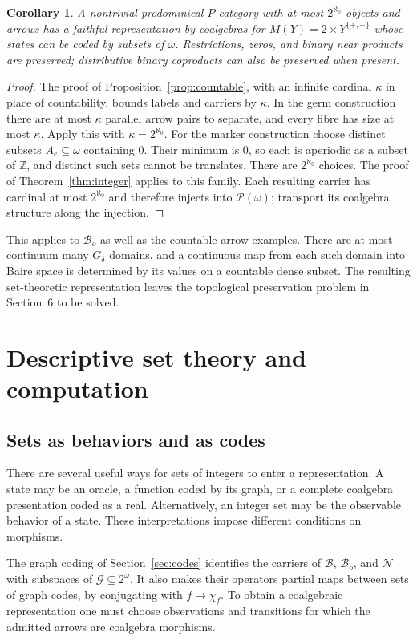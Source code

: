 \documentclass[11pt]{article}
\newtheorem{corollary}[theorem]{Corollary}
\theoremstyle{definition}
\newcommand{\N}{\omega}
\newcommand{\Z}{\mathbb Z}
\begin{document}
\begin{corollary}\label{cor:reals}
A nontrivial prodominical $P$-category with at most $2^{\aleph_0}$
objects and arrows has a faithful representation by coalgebras for
$M(Y)=2\times Y^{\{+,-\}}$ whose states can be coded by subsets of
$\N$. Restrictions, zeros, and binary near products are preserved;
distributive binary coproducts can also be preserved when present.
\end{corollary}
\begin{proof}
The proof of Proposition~\ref{prop:countable}, with an infinite
cardinal $\kappa$ in place of countability, bounds labels and carriers
by $\kappa$. In the germ construction there are at most $\kappa$
parallel arrow pairs to separate, and every fibre has size at most
$\kappa$. Apply this with $\kappa=2^{\aleph_0}$.
For the marker construction choose distinct subsets $A_e\subseteq\N$
containing $0$. Their minimum is $0$, so each is aperiodic as a subset
of $\Z$, and distinct such sets cannot be translates. There are
$2^{\aleph_0}$ choices. The proof of Theorem~\ref{thm:integer}
applies to this family. Each resulting carrier has cardinal at most
$2^{\aleph_0}$ and therefore injects into $\mathcal P(\N)$;
transport its coalgebra structure along the injection.
\end{proof}

This applies to $\mathcal B_o$ as well as the countable-arrow examples.
There are at most continuum many $G_\delta$ domains, and a continuous
map from each such domain into Baire space is determined by its values
on a countable dense subset. The resulting set-theoretic representation
leaves the topological preservation problem in Section~6 to be solved.

\section{Descriptive set theory and computation}
\subsection{Sets as behaviors and as codes}

There are several useful ways for sets of integers to enter a
representation. A state may be an oracle, a function coded by its graph,
or a complete coalgebra presentation coded as a real. Alternatively,
an integer set may be the observable behavior of a state. These
interpretations impose different conditions on morphisms.

The graph coding of Section~\ref{sec:codes} identifies the carriers
of $\mathcal B$, $\mathcal B_o$, and $\mathcal N$ with subspaces
of $\mathcal G\subseteq2^\omega$. It also makes their operators
partial maps between sets of graph codes, by conjugating with
$f\mapsto\chi_f$. To obtain a coalgebraic representation one must
choose observations and transitions for which the admitted arrows
are coalgebra morphisms.
\end{document}
